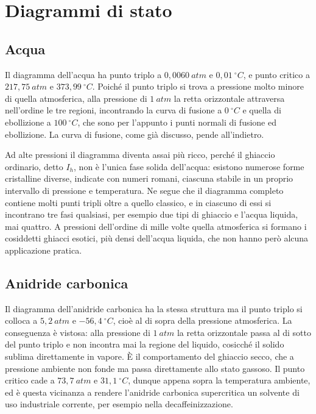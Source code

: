 \section{Diagrammi di stato}
 
\subsection{Acqua}
 
Il diagramma dell'acqua ha punto triplo a $0{,}0060 \ atm$ e $0{,}01 \ ^\circ C$, e punto critico a $217{,}75 \ atm$ e $373{,}99 \ ^\circ C$.
Poiché il punto triplo si trova a pressione molto minore di quella atmosferica, alla pressione di $1 \ atm$ la retta orizzontale attraversa nell'ordine le tre regioni, incontrando la curva di fusione a $0 \ ^\circ C$ e quella di ebollizione a $100 \ ^\circ C$, che sono per l'appunto i punti normali di fusione ed ebollizione.
La curva di fusione, come già discusso, pende all'indietro.
 
Ad alte pressioni il diagramma diventa assai più ricco, perché il ghiaccio ordinario, detto $I_h$, non è l'unica fase solida dell'acqua: esistono numerose forme cristalline diverse, indicate con numeri romani, ciascuna stabile in un proprio intervallo di pressione e temperatura.
Ne segue che il diagramma completo contiene molti punti tripli oltre a quello classico, e in ciascuno di essi si incontrano tre fasi qualsiasi, per esempio due tipi di ghiaccio e l'acqua liquida, mai quattro.
A pressioni dell'ordine di mille volte quella atmosferica si formano i cosiddetti ghiacci esotici, più densi dell'acqua liquida, che non hanno però alcuna applicazione pratica.
 
\subsection{Anidride carbonica}
 
Il diagramma dell'anidride carbonica ha la stessa struttura ma il punto triplo si colloca a $5{,}2 \ atm$ e $-56{,}4 \ ^\circ C$, cioè al di sopra della pressione atmosferica.
La conseguenza è vistosa: alla pressione di $1 \ atm$ la retta orizzontale passa al di sotto del punto triplo e non incontra mai la regione del liquido, cosicché il solido sublima direttamente in vapore.
È il comportamento del ghiaccio secco, che a pressione ambiente non fonde ma passa direttamente allo stato gassoso.
Il punto critico cade a $73{,}7 \ atm$ e $31{,}1 \ ^\circ C$, dunque appena sopra la temperatura ambiente, ed è questa vicinanza a rendere l'anidride carbonica supercritica un solvente di uso industriale corrente, per esempio nella decaffeinizzazione.
 
